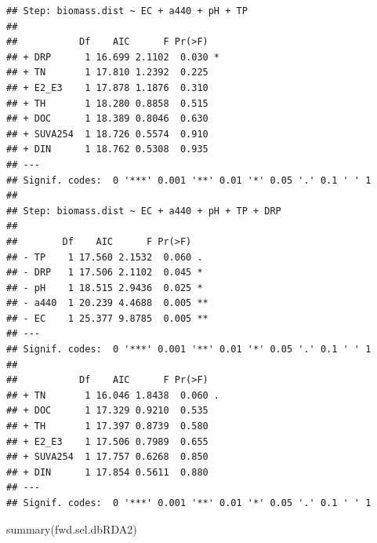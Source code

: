 \documentclass[
]{book}
\newenvironment{Shaded}{\begin{snugshade}}{\end{snugshade}}
\newcommand{\FunctionTok}[1]{\textcolor[rgb]{0.00,0.00,0.00}{#1}}
\newcommand{\NormalTok}[1]{#1}
\begin{document}
\begin{verbatim}
## Step: biomass.dist ~ EC + a440 + pH + TP 
## 
##           Df    AIC      F Pr(>F)  
## + DRP      1 16.699 2.1102  0.030 *
## + TN       1 17.810 1.2392  0.225  
## + E2_E3    1 17.878 1.1876  0.310  
## + TH       1 18.280 0.8858  0.515  
## + DOC      1 18.389 0.8046  0.630  
## + SUVA254  1 18.726 0.5574  0.910  
## + DIN      1 18.762 0.5308  0.935  
## ---
## Signif. codes:  0 '***' 0.001 '**' 0.01 '*' 0.05 '.' 0.1 ' ' 1
## 
## Step: biomass.dist ~ EC + a440 + pH + TP + DRP 
## 
##        Df    AIC      F Pr(>F)   
## - TP    1 17.560 2.1532  0.060 . 
## - DRP   1 17.506 2.1102  0.045 * 
## - pH    1 18.515 2.9436  0.025 * 
## - a440  1 20.239 4.4688  0.005 **
## - EC    1 25.377 9.8785  0.005 **
## ---
## Signif. codes:  0 '***' 0.001 '**' 0.01 '*' 0.05 '.' 0.1 ' ' 1
## 
##           Df    AIC      F Pr(>F)  
## + TN       1 16.046 1.8438  0.060 .
## + DOC      1 17.329 0.9210  0.535  
## + TH       1 17.397 0.8739  0.580  
## + E2_E3    1 17.506 0.7989  0.655  
## + SUVA254  1 17.757 0.6268  0.850  
## + DIN      1 17.854 0.5611  0.880  
## ---
## Signif. codes:  0 '***' 0.001 '**' 0.01 '*' 0.05 '.' 0.1 ' ' 1
\end{verbatim}

\begin{Shaded}
\begin{Highlighting}[]
\FunctionTok{summary}\NormalTok{(fwd.sel.dbRDA2)}
\end{Highlighting}
\end{Shaded}
\end{document}
